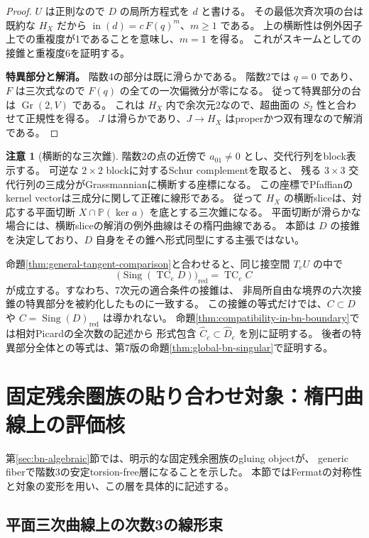 \documentclass[a4paper,11pt]{ltjsarticle}
\theoremstyle{definition}
\newtheorem{remark}[theorem]{注意}
\newcommand{\PP}{\mathbb P}
\newcommand{\Gr}{\operatorname{Gr}}
\begin{document}
\begin{proof}
$U$ は正則なので $D$ の局所方程式を $d$ と書ける。
その最低次斉次項の台は既約な $H_X$ だから
$\operatorname{in}(d)=c\,F(q)^m$、$m\ge1$ である。
上の横断性は例外因子上での重複度が1であることを意味し、$m=1$ を得る。
これがスキームとしての接錐と重複度6を証明する。

\textbf{特異部分と解消。}
階数4の部分は既に滑らかである。
階数2では $q=0$ であり、$F$ は三次式なので $F(q)$ の全ての一次偏微分が零になる。
従って特異部分の台は $\Gr(2,V)$ である。
これは $H_X$ 内で余次元2なので、超曲面の $S_2$ 性と合わせて正規性を得る。
$J$ は滑らかであり、$J\to H_X$ はproperかつ双有理なので解消である。
\end{proof}

\begin{remark}[横断的な三次錐]
階数2の点の近傍で $a_{01}\ne0$ とし、交代行列をblock表示する。
可逆な $2\times2$ blockに対するSchur complementを取ると、
残る $3\times3$ 交代行列の三成分がGrassmannianに横断する座標になる。
この座標でPfaffianのkernel vectorは三成分に関して正確に線形である。
従って $H_X$ の横断sliceは、対応する平面切断
$X\cap\PP(\ker a)$ を底とする三次錐になる。
平面切断が滑らかな場合には、横断sliceの解消の例外曲線はその楕円曲線である。
本節は $D$ の接錐を決定しており、$D$ 自身をその錐へ形式同型にする主張ではない。
\end{remark}

命題\ref{thm:general-tangent-comparison}と合わせると、同じ接空間 $T_eU$ の中で
\[
 \bigl(\operatorname{Sing}(\operatorname{TC}_eD)\bigr)_{\mathrm{red}}
                  =\operatorname{TC}_eC
\]
が成立する。すなわち、7次元の適合条件の接錐は、
非局所自由な境界の六次接錐の特異部分を被約化したものに一致する。
この接錐の等式だけでは、$C\subset D$ や
$C=\operatorname{Sing}(D)_{\mathrm{red}}$ は導かれない。
命題\ref{thm:compatibility-in-bn-boundary}では相対Picardの全次数の記述から
形式包含 $\widehat C_c\subset\widehat D_e$ を別に証明する。
後者の特異部分全体との等式は、第7版の命題\ref{thm:global-bn-singular}で証明する。


\section{固定残余圏族の貼り合わせ対象：楕円曲線上の評価核}\label{sec:evaluation-gluing}

第\ref{sec:bn-algebraic}節では、明示的な固定残余圏族のgluing objectが、
generic fiberで階数3の安定torsion-free層になることを示した。
本節ではFermatの対称性と対象の変形を用い、この層を具体的に記述する。

\subsection{平面三次曲線上の次数3の線形束}
\end{document}
